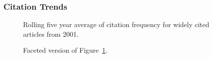 \documentclass[
  10pt,
  letterpaper,
  DIV=11,
  numbers=noendperiod,
  twoside]{scrartcl}
\begin{document}
\subsubsection*{Citation Trends}\label{sec-trends-2001}

\begin{figure}


\caption{\label{fig-citation-spaghetti-2001}Rolling five year average of
citation frequency for widely cited articles from 2001.}

\end{figure}%

\begin{figure}


\caption{\label{fig-citation-facet-2001}Faceted version of
Figure~\ref{fig-citation-spaghetti-2001}.}

\end{figure}%
\end{document}

